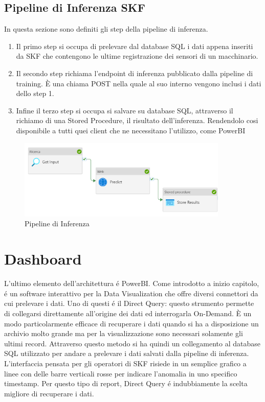 \subsection{Pipeline di Inferenza SKF}
In questa sezione sono definiti gli step della pipeline di inferenza.
\begin{enumerate}
	\item Il primo step si occupa di prelevare dal database SQL i dati appena inseriti da SKF che contengono le ultime registrazione dei sensori di un macchinario. 
	\item Il secondo step richiama l'endpoint di inferenza pubblicato dalla pipeline di training. È una chiama POST nella quale al suo interno vengono inclusi i dati dello step 1.
	\item Infine il terzo step si occupa si salvare su database SQL, attraverso il richiamo di una Stored Procedure, il risultato dell'inferenza. Rendendolo cosi disponibile a tutti quei client che ne necessitano l'utilizzo, come PowerBI
\end{enumerate}

\begin{figure}[t]
	\centering
	\includegraphics[width=10cm, scale=1]{images/pipeline-inference}
	\caption{Pipeline di Inferenza}
	\label{pipeline-inferenza}
\end{figure}

\section{Dashboard}
L'ultimo elemento dell'architettura é PowerBI. Come introdotto a inizio capitolo, é un software interattivo per la Data Visualization che offre diversi connettori da cui prelevare i dati. Uno di questi é il Direct Query: questo strumento permette di collegarsi direttamente all'origine dei dati ed interrogarla On-Demand. È un modo particolarmente efficace di recuperare i dati quando si ha a disposizione un archivio molto grande ma per la visualizzazione sono necessari solamente gli ultimi record. 
Attraverso questo metodo si ha quindi un collegamento al database SQL utilizzato per andare a prelevare i dati salvati dalla pipeline di inferenza.
L'interfaccia pensata per gli operatori di SKF risiede in un semplice grafico a linee con delle barre verticali rosse per indicare l'anomalia in uno specifico timestamp. Per questo tipo di report, Direct Query é indubbiamente la scelta migliore di recuperare i dati.  


